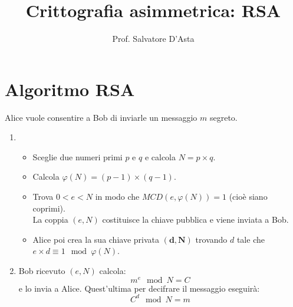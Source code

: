 \documentclass[10pt,a4paper]{article}
\begin{document}
\title{Crittografia asimmetrica: RSA }
\author{Prof. Salvatore D'Asta}

\maketitle
\tableofcontents
\pagebreak
\section{Algoritmo RSA}
%
%
%

Alice vuole consentire a Bob di inviarle un messaggio $ m $ segreto.
\begin{enumerate}
	\item 
	\begin{itemize}
		\item Sceglie due numeri primi $ p $ e $ q $ e calcola $ N=p\times q $.
		\item Calcola $ \varphi(N)=(p-1)\times (q-1) $. 
		\item Trova $ 0<e<N $ in modo che $ MCD(e,\varphi(N))=1 $ (cioè siano coprimi).\\ La coppia $ (e,N) $ costituisce la chiave pubblica e viene inviata a Bob.
		\item Alice poi crea la sua chiave privata $ \mathbf{(d,N)} $ trovando $ d $ tale che $ \boxed{e\times d\equiv 1 \mod \varphi(N) } $.
	\end{itemize}
	\item Bob ricevuto $ (e,N) $ calcola: \[ m^e \mod N=C \] e lo invia a Alice. Quest'ultima per decifrare il messaggio eseguirà:\[ C^d \mod N =m \]
\end{enumerate}
\end{document}
